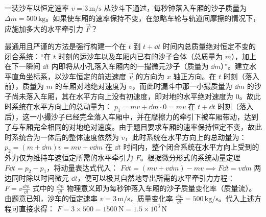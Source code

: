 \documentclass[lang=cn,11pt]{elegantbook}
\begin{document}
\begin{example}
一装沙车以恒定速率 $v = 3\,\mathrm{m/s}$ 从沙斗下通过，每秒钟落入车厢的沙子质量为 $\Delta m = 500\,\mathrm{kg}$。如果使车厢的速率保持不变，在忽略车轮与轨道间摩擦的情况下，应施加多大的水平牵引力 $\vec{F}$？
\end{example}
\begin{solution}
最通用且严谨的方法是强行构建一个在 $t$ 到 $t+\dd t$ 时间内总质量绝对恒定不变的闭合系统：“在 $t$ 时刻的运沙车以及车厢内已有的沙子合体（总质量为 $m$），加上在下一瞬间 $\dd t$ 内即将从小孔落入车厢内的一撮微元沙子（质量为 $\dd m$）”。建立水平直角坐标系，以沙车恒定的前进速度 $\vec{v}$ 的方向为 $x$ 轴正方向。在 $t$ 时刻（落入前），质量为 $m$ 的车厢对地绝对速度为 $v$，而此时漏斗中那一小撮质量为 $\dd m$ 的沙子尚未落入车厢，其在水平方向上没有初速度，即对地的水平绝对速度为 $0$。故此时系统在水平方向上的总动量为：
 \(p_1 = mv + \dd m \cdot 0 = mv\) 
在 $t+\dd t$ 时刻（落入后），这一小撮沙子已经完全落入车厢中，并在摩擦力的牵引下被车厢带动，达到了与车厢完全相同的对地绝对速度。由于题目要求车厢的速率保持恒定不变，故此时系统合为一体后的整体速度依然为 $v$，此时系统在水平方向上的总动量为：
 \(p_2 = (m + \dd m)v = mv + v\dd m\) 
在 $\dd t$ 时间内，整个闭合系统在水平方向上受到的外力仅为维持车速恒定所需的水平牵引力 $F$。根据微分形式的系统动量定理 $F\dd t = p_2 - p_1$，将动量表达式代入：
 \(F\dd t = (mv + v\dd m) - mv \implies F\dd t = v\dd m\) 
两边同时除以时间微元 $\dd t$，便可以极其自然地导出所需的水平牵引力方程：
 \(F = v\frac{\dd m}{\dd t}\) 
式中的 $\frac{\dd m}{\dd t}$ 物理意义即为每秒钟落入车厢的沙子质量变化率（质量流）。由题意已知，沙车的恒定速率 $v = 3\,\mathrm{m/s}$，质量变化率 $\frac{\dd m}{\dd t} = 500\,\mathrm{kg/s}$。代入上述方程可直接求得：
 \(F = 3 \times 500 = 1500\,\mathrm{N} = 1.5 \times 10^3\,\mathrm{N}\) 
\end{solution}
\end{document}

